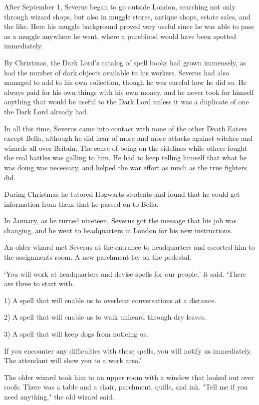 After September 1, Severus began to go outside London, searching not only through wizard shops, but also in muggle stores, antique shops, estate sales, and the like. Here his muggle background proved very useful since he was able to pass as a muggle anywhere he went, where a pureblood would have been spotted immediately.

By Christmas, the Dark Lord's catalog of spell books had grown immensely, as had the number of dark objects available to his workers. Severus had also managed to add to his own collection, though he was careful how he did so. He always paid for his own things with his own money, and he never took for himself anything that would be useful to the Dark Lord unless it was a duplicate of one the Dark Lord already had.

In all this time, Severus came into contact with none of the other Death Eaters except Bella, although he did hear of more and more attacks against witches and wizards all over Britain. The sense of being on the sidelines while others fought the real battles was galling to him. He had to keep telling himself that what he was doing was necessary, and helped the war effort as much as the true fighters did.

During Christmas he tutored Hogwarts students and found that he could get information from them that he passed on to Bella.

In January, as he turned nineteen, Severus got the message that his job was changing, and he went to headquarters in London for his new instructions.

An older wizard met Severus at the entrance to headquarters and escorted him to the assignments room. A new parchment lay on the pedestal.

`You will work at headquarters and devise spells for our people,' it said. `There are three to start with.

1) A spell that will enable us to overhear conversations at a distance.

2) A spell that will enable us to walk unheard through dry leaves.

3) A spell that will keep dogs from noticing us.

If you encounter any difficulties with these spells, you will notify us immediately. The attendant will show you to a work area.'

The older wizard took him to an upper room with a window that looked out over roofs. There was a table and a chair, parchment, quills, and ink. "Tell me if you need anything," the old wizard said.

